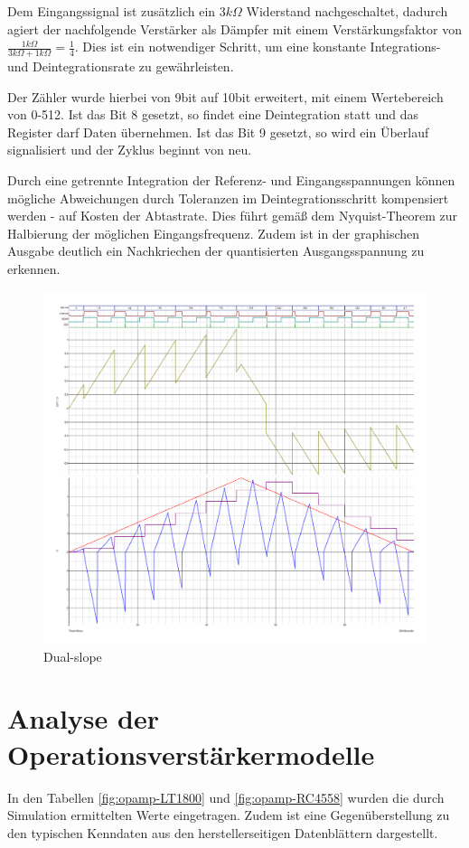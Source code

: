 \documentclass[
	ngerman,
	parskip=half,
	headsepline,
	fontsize=12pt,
	DIV=13,
	listof=leveldown,
	]{scrreprt}
\begin{document}
		Dem Eingangssignal ist zusätzlich ein $3k\Omega$ Widerstand nachgeschaltet, dadurch agiert der nachfolgende Verstärker als Dämpfer mit einem Verstärkungsfaktor von $\frac{1k\Omega}{3k\Omega + 1k\Omega} = \frac{1}{4}$. Dies ist ein notwendiger Schritt, um eine konstante Integrations- und Deintegrationsrate zu gewährleisten. 
		
		Der Zähler wurde hierbei von 9bit auf 10bit erweitert, mit einem Wertebereich von 0-512. Ist das Bit 8 gesetzt, so findet eine Deintegration statt und das Register darf Daten übernehmen. Ist das Bit 9 gesetzt, so wird ein Überlauf signalisiert und der Zyklus beginnt von neu. 
		
		Durch eine getrennte Integration der Referenz- und Eingangsspannungen können mögliche Abweichungen durch Toleranzen im Deintegrationsschritt kompensiert werden - auf Kosten der Abtastrate. Dies führt gemäß dem Nyquist-Theorem zur Halbierung der möglichen Eingangsfrequenz. Zudem ist in der graphischen Ausgabe deutlich ein Nachkriechen der quantisierten Ausgangsspannung zu erkennen. 
		
		\begin{figure}[!h]
			\centering
			\includegraphics[width=\linewidth]{dual_slope_adc_ideal_opamp}
			\caption{Dual-slope}
			\label{fig:dual-slope-ideal}
		\end{figure}
	
		\section{Analyse der Operationsverstärkermodelle}
		In den Tabellen \ref{fig:opamp-LT1800} und \ref{fig:opamp-RC4558} wurden die durch Simulation ermittelten Werte eingetragen. Zudem ist eine Gegenüberstellung zu den typischen Kenndaten aus den herstellerseitigen Datenblättern  dargestellt. 
		
\end{document}
